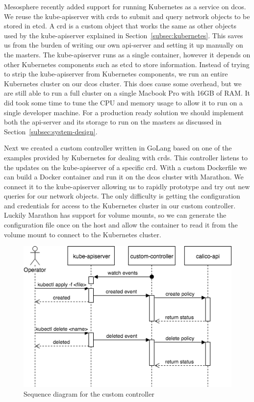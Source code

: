 Mesosphere recently added support for running Kubernetes as a service on \gls{dcos}. We reuse the kube-apiserver with \glspl{crd} to submit and query network objects to be stored in etcd. A \gls{crd} is a custom object that works the same as other objects used by the kube-apiserver explained in Section~\ref{subsec:kubernetes}. This saves us from the burden of writing our own api-server and setting it up manually on the masters. The kube-apiserver runs as a single container, however it depends on other Kubernetes components such as etcd to store information. Instead of trying to strip the kube-apiserver from Kubernetes components, we run an entire Kubernetes cluster on our \gls{dcos} cluster. This does cause some overhead, but we are still able to run a full cluster on a single Macbook Pro with 16GB of RAM. It did took some time to tune the CPU and memory usage to allow it to run on a single developer machine. For a production ready solution we should implement both the api-server and its storage to run on the masters as discussed in Section~\ref{subsec:system-design}.

Next we created a custom controller written in GoLang\cite{golang} based on one of the examples provided by Kubernetes for dealing with \glspl{crd}. This controller listens to the updates on the kube-apiserver of a specific \gls{crd}. With a custom Dockerfile we can build a Docker container and run it on the \gls{dcos} cluster with Marathon. We connect it to the kube-apiserver allowing us to rapidly prototype and try out new queries for our network objects. The only difficulty is getting the configuration and credentials for access to the Kubernetes cluster in our custom controller. Luckily Marathon has support for volume mounts, so we can generate the configuration file once on the host and allow the container to read it from the volume mount to connect to the Kubernetes cluster.

\begin{figure}
    \centering
    \includegraphics[width=0.7\columnwidth]{images/customer-controller-sequence-diagram}
    \caption{Sequence diagram for the custom controller}
    \label{fig:custrom-controller-sequence-diagram}
\end{figure}

